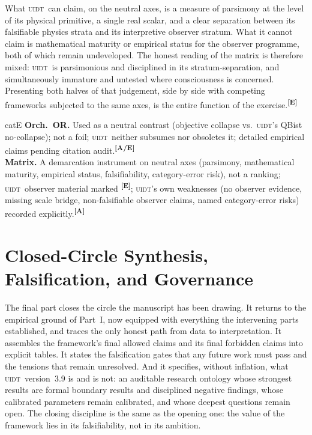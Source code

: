 \documentclass[12pt,a4paper,twoside]{article}
\theoremstyle{plain}
\theoremstyle{definition}
\theoremstyle{remark}
\newcommand{\UIDT}{\textsc{uidt}}
\newcommand{\catmark}[1]{\textsuperscript{\textsf{\textbf{[#1]}}}}
\begin{document}
What \UIDT\ can claim, on the neutral axes, is a measure of parsimony at the level of its physical primitive, a single real scalar, and a clear separation between its falsifiable physics strata and its interpretive observer stratum. What it cannot claim is mathematical maturity or empirical status for the observer programme, both of which remain undeveloped. The honest reading of the matrix is therefore mixed: \UIDT\ is parsimonious and disciplined in its stratum-separation, and simultaneously immature and untested where consciousness is concerned. Presenting both halves of that judgement, side by side with competing frameworks subjected to the same axes, is the entire function of the exercise.\catmark{E}

\begin{evidencebox}{catE}
\textbf{Orch.\ OR.} Used as a neutral contrast (objective collapse vs.\ \UIDT's QBist no-collapse); not a foil; \UIDT\ neither subsumes nor obsoletes it; detailed
empirical claims pending citation audit.\catmark{A/E}\\[0.3em]
\textbf{Matrix.} A demarcation instrument on neutral axes (parsimony, mathematical maturity, empirical status, falsifiability, category-error risk), not a ranking; \UIDT\ observer material marked \catmark{E}; \UIDT's own weaknesses (no observer evidence, missing scale bridge, non-falsifiable observer claims, named category-error risks) recorded explicitly.\catmark{A}
\end{evidencebox}

\newpage
\part{Closed-Circle Synthesis, Falsification, and Governance}
\label{part:synthesis-governance}

\noindent The final part closes the circle the manuscript has been drawing. It returns to the empirical ground of Part~I, now equipped with everything the intervening parts established, and traces the only honest path from data to interpretation. It assembles the framework's final allowed claims and its final forbidden claims into explicit tables. It states the falsification gates that any future work must pass and the tensions that remain unresolved. And it specifies, without inflation, what \UIDT\ version~3.9 is and is not: an auditable research ontology whose strongest results are formal boundary results and disciplined negative findings, whose calibrated parameters remain calibrated, and whose deepest questions remain open. The closing discipline is the same as the opening one: the value of the framework lies in its falsifiability, not in its ambition.
\newpage
\end{document}
